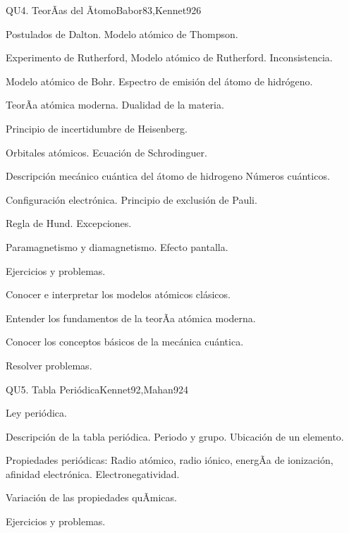 \begin{syllabus}
\begin{unit}{QU4. TeorÃ­as del Ãtomo}{Babor83,Kennet92}{6}
\begin{topics}
      \item Postulados de Dalton. Modelo atómico de Thompson.
      \item Experimento de Rutherford, Modelo atómico de Rutherford. Inconsistencia.
      \item Modelo atómico de Bohr. Espectro de emisión del átomo de hidrógeno.
      \item TeorÃ­a atómica moderna. Dualidad de la materia.
      \item Principio de incertidumbre de Heisenberg.
      \item Orbitales atómicos. Ecuación de Schrodinguer.
      \item Descripción mecánico cuántica del átomo de hidrogeno Números cuánticos.
      \item Configuración electrónica. Principio de exclusión de Pauli.
      \item Regla de Hund. Excepciones.
      \item Paramagnetismo y diamagnetismo. Efecto pantalla.
      \item Ejercicios y problemas.
   \end{topics}

   \begin{unitgoals}
      \item Conocer e interpretar los modelos atómicos clásicos.
      \item Entender los fundamentos de la teorÃ­a atómica moderna.
      \item Conocer los conceptos básicos de la mecánica cuántica.
      \item Resolver problemas.
   \end{unitgoals}
\end{unit}

\begin{unit}{QU5. Tabla Periódica}{Kennet92,Mahan92}{4}
\begin{topics}
	\item Ley periódica.
	\item Descripción de la tabla periódica. Periodo y grupo. Ubicación de un elemento.
	\item Propiedades periódicas: Radio atómico, radio iónico, energÃ­a de ionización, afinidad electrónica. Electronegatividad.
	\item Variación de las propiedades quÃ­micas.
	\item Ejercicios y problemas.
   \end{topics}


\end{unit}
\end{syllabus}

